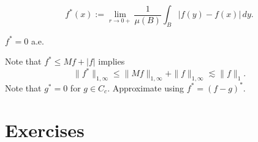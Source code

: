 \documentclass{../../large}
\begin{document}
\begin{defn}
\[f^*(x):=\lim_{r\to0+}\frac1{\mu(B)}\int_B|f(y)-f(x)|\,dy.\]
\end{defn}
\begin{thm}
$f^*=0$ a.e.
\end{thm}
\begin{pf}
Note that $f^*\le Mf+|f|$ implies
\[\|f^*\|_{1,\infty}\le\|Mf\|_{1,\infty}+\|f\|_{1,\infty}\lesssim\|f\|_1.\]
Note that $g^*=0$ for $g\in C_c$.
Approximate using $f^*=(f-g)^*$.
\end{pf}

\section*{Exercises}
\begin{prb}

\end{prb}
\end{document}
